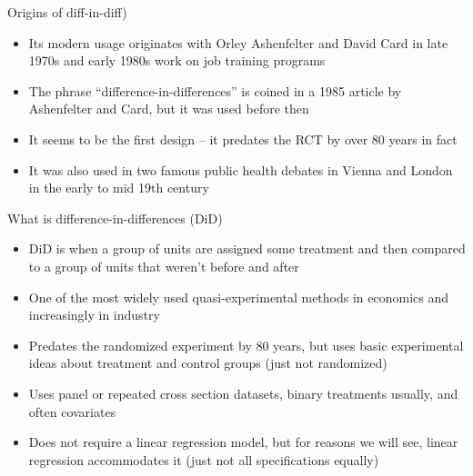 \documentclass{beamer}
\begin{document}
\begin{frame}{Origins of diff-in-diff)}

\begin{itemize}
\item Its modern usage originates with Orley Ashenfelter and David Card in late 1970s and early 1980s work on job training programs
\item The phrase ``difference-in-differences'' is coined in a 1985 article by Ashenfelter and Card, but it was used before then
\item It seems to be the first design -- it predates the RCT by over 80 years in fact
\item It was also used in two famous public health debates in Vienna and London in the early to mid 19th century

\end{itemize}
\end{frame}




\begin{frame}{What is difference-in-differences (DiD)}

\begin{itemize}
\item DiD is when a group of units are assigned some treatment and then compared to a group of units that weren't before and after
\item One of the most widely used quasi-experimental methods in economics and increasingly in industry
\item Predates the randomized experiment by 80 years, but uses basic experimental ideas about treatment and control groups (just not randomized)
\item Uses panel or repeated cross section datasets, binary treatments usually, and often covariates 
\item Does not require a linear regression model, but for reasons we will see, linear regression accommodates it (just not all specifications equally)

\end{itemize}
\end{frame}
\end{document}
